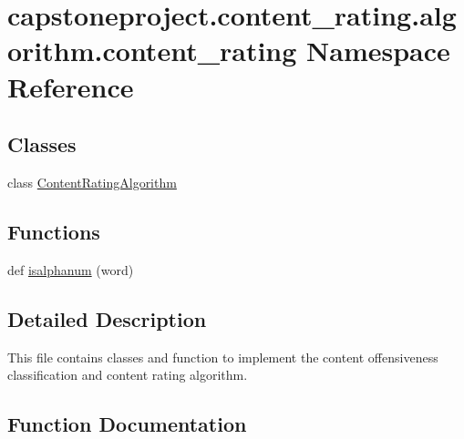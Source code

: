 \hypertarget{namespacecapstoneproject_1_1content__rating_1_1algorithm_1_1content__rating}{}\section{capstoneproject.\+content\+\_\+rating.\+algorithm.\+content\+\_\+rating Namespace Reference}
\label{namespacecapstoneproject_1_1content__rating_1_1algorithm_1_1content__rating}
\subsection*{Classes}
\begin{DoxyCompactItemize}
\item 
class \mbox{\hyperlink{classcapstoneproject_1_1content__rating_1_1algorithm_1_1content__rating_1_1_content_rating_algorithm}{Content\+Rating\+Algorithm}}
\end{DoxyCompactItemize}
\subsection*{Functions}
\begin{DoxyCompactItemize}
\item 
def \mbox{\hyperlink{namespacecapstoneproject_1_1content__rating_1_1algorithm_1_1content__rating_a9b5e7be19488499ad4360daee72c9896}{isalphanum}} (word)
\end{DoxyCompactItemize}


\subsection{Detailed Description}
\begin{DoxyVerb}This file contains classes and function to implement the content
offensiveness classification and content rating algorithm.
\end{DoxyVerb}
 

\subsection{Function Documentation}
\mbox{\label{namespacecapstoneproject_1_1content__rating_1_1algorithm_1_1content__rating_a9b5e7be19488499ad4360daee72c9896}} 
